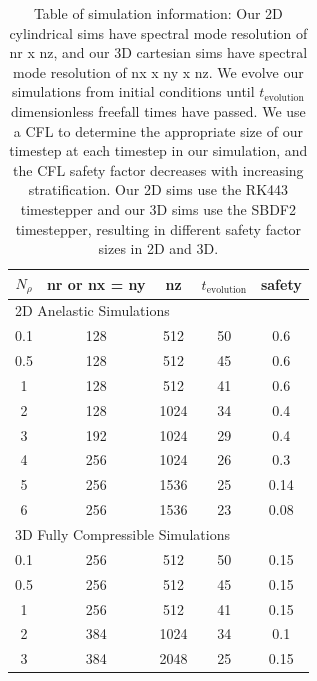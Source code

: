 \begin{table}
\caption[Simulation information for Anders, Lecoanet, \& Brown 2019]{Table of simulation information:
Our 2D cylindrical sims have spectral mode resolution of nr x nz, and our 3D cartesian sims have spectral mode resolution of nx x ny x nz.
We evolve our simulations from initial conditions until $t_{\text{evolution}}$ dimensionless freefall times have passed.
We use a CFL to determine the appropriate size of our timestep at each timestep in our simulation, and the CFL safety factor decreases with increasing stratification.
Our 2D sims use the RK443 timestepper and our 3D sims use the SBDF2 timestepper, resulting in different safety factor sizes in 2D and 3D.
\label{table:simulation_info}
}
\begin{center}
\begin{tabular}{c c c c c }
$N_\rho$ & nr or nx = ny & nz & $t_{\text{evolution}}$ & safety	\\
\hline\hline
\multicolumn{5}{l}{2D Anelastic Simulations}\\
0.1 	& 		128			& 512			& 50 	&	0.6	\\
0.5 	& 		128			& 512			& 45 	&	0.6	\\
1	 	& 		128			& 512			& 41 	&	0.6	\\
2	 	& 		128			& 1024			& 34	&	0.4	\\
3	 	& 		192			& 1024			& 29	&	0.4	\\
4	 	& 		256			& 1024			& 26 	&	0.3	\\
5	 	& 		256			& 1536			& 25 	&	0.14	\\
6	 	& 		256			& 1536			& 23 	&	0.08	\\
\multicolumn{5}{l}{3D Fully Compressible Simulations}\\
0.1 	& 		256			& 512			& 50 		&	0.15	\\
0.5 	& 		256			& 512			& 45 		&	0.15	\\
1	 	& 		256			& 512			& 41	 	&	0.15	\\
2	 	& 		384			& 1024			& 34    	&	0.1	\\
3	 	& 		384			& 2048			& 25    	&	0.15	\\
\hline
\end{tabular}
\end{center}
\end{table}

\newpage

